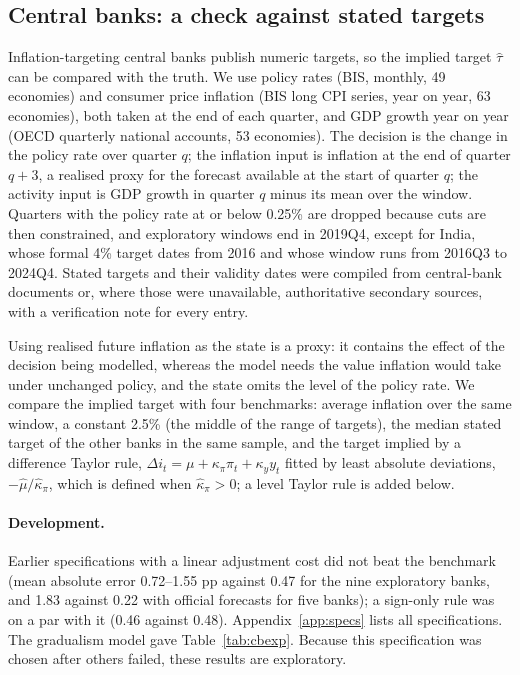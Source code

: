 \documentclass[11pt,a4paper]{article}
\theoremstyle{remark}\newtheorem{remark}{Remark}
\begin{document}
\subsection{Central banks: a check against stated targets}\label{sec:cb}
Inflation-targeting central banks publish numeric targets, so the implied target $\hat\tau$ can be compared with the truth. We use policy rates (BIS, monthly, 49 economies) and consumer price inflation (BIS long CPI series, year on year, 63 economies), both taken at the end of each quarter, and GDP growth year on year (OECD quarterly national accounts, 53 economies). The decision is the change in the policy rate over quarter $q$; the inflation input is inflation at the end of quarter $q+3$, a realised proxy for the forecast available at the start of quarter $q$; the activity input is GDP growth in quarter $q$ minus its mean over the window. Quarters with the policy rate at or below 0.25\% are dropped because cuts are then constrained, and exploratory windows end in 2019Q4, except for India, whose formal 4\% target dates from 2016 and whose window runs from 2016Q3 to 2024Q4. Stated targets and their validity dates were compiled from central-bank documents or, where those were unavailable, authoritative secondary sources, with a verification note for every entry.

Using realised future inflation as the state is a proxy: it contains the effect of the decision being modelled, whereas the model needs the value inflation would take under unchanged policy, and the state omits the level of the policy rate. We compare the implied target with four benchmarks: average inflation over the same window, a constant 2.5\% (the middle of the range of targets), the median stated target of the other banks in the same sample, and the target implied by a difference Taylor rule, $\Delta i_t=\mu+\kappa_\pi\pi_t+\kappa_yy_t$ fitted by least absolute deviations, $-\hat\mu/\hat\kappa_\pi$, which is defined when $\hat\kappa_\pi>0$; a level Taylor rule is added below.

\paragraph{Development.} Earlier specifications with a linear adjustment cost did not beat the benchmark (mean absolute error 0.72--1.55 pp against 0.47 for the nine exploratory banks, and 1.83 against 0.22 with official forecasts for five banks); a sign-only rule was on a par with it (0.46 against 0.48). Appendix~\ref{app:specs} lists all specifications. The gradualism model gave Table~\ref{tab:cbexp}. Because this specification was chosen after others failed, these results are exploratory.
\begin{table}[t]\centering\small
\caption{Exploratory banks (gradualism model, realised inputs).}\label{tab:cbexp}\end{table}
\end{document}
